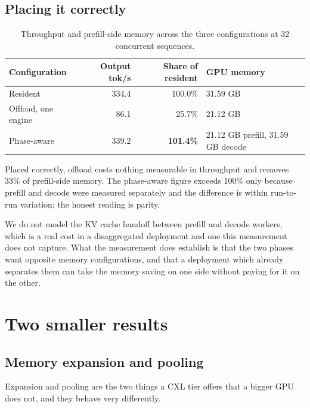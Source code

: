 \documentclass[10pt,a4paper]{article}
\begin{document}
\subsection{Placing it correctly}

\begin{table}[htbp]
\centering\small
\caption{Throughput and prefill-side memory across the three configurations at
32 concurrent sequences.}
\label{tab:phaseaware}
\begin{tabular}{lrrl}
\toprule
Configuration & Output tok/s & Share of resident & GPU memory \\
\midrule
Resident     & 334.4 & 100.0\% & 31.59 GB \\
Offload, one engine & 86.1 & 25.7\% & 21.12 GB \\
Phase-aware  & 339.2 & \textbf{101.4\%} & 21.12 GB prefill, 31.59 GB decode \\
\bottomrule
\end{tabular}
\end{table}

Placed correctly, offload costs nothing measurable in throughput and removes
33\% of prefill-side memory. The phase-aware figure exceeds 100\% only because
prefill and decode were measured separately and the difference is within
run-to-run variation; the honest reading is parity.

We do not model the KV cache handoff between prefill and decode workers, which
is a real cost in a disaggregated deployment and one this measurement does not
capture. What the measurement does establish is that the two phases want
opposite memory configurations, and that a deployment which already separates
them can take the memory saving on one side without paying for it on the other.

\section{Two smaller results}

\subsection{Memory expansion and pooling}
\label{sec:pooling}

Expansion and pooling are the two things a CXL tier offers that a bigger GPU does
not, and they behave very differently.
\end{document}
